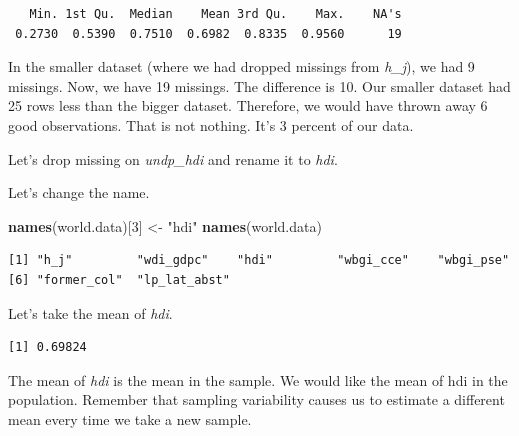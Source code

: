 \documentclass[]{book}
\newenvironment{Shaded}{\begin{snugshade}}{\end{snugshade}}
\newcommand{\KeywordTok}[1]{\textcolor[rgb]{0.13,0.29,0.53}{\textbf{#1}}}
\newcommand{\DecValTok}[1]{\textcolor[rgb]{0.00,0.00,0.81}{#1}}
\newcommand{\StringTok}[1]{\textcolor[rgb]{0.31,0.60,0.02}{#1}}
\newcommand{\OperatorTok}[1]{\textcolor[rgb]{0.81,0.36,0.00}{\textbf{#1}}}
\newcommand{\NormalTok}[1]{#1}
\theoremstyle{definition}
\theoremstyle{definition}
\theoremstyle{definition}
\theoremstyle{remark}
\begin{document}
\begin{verbatim}
   Min. 1st Qu.  Median    Mean 3rd Qu.    Max.    NA's 
 0.2730  0.5390  0.7510  0.6982  0.8335  0.9560      19 
\end{verbatim}

In the smaller dataset (where we had dropped missings from \emph{h\_j}),
we had 9 missings. Now, we have 19 missings. The difference is 10. Our
smaller dataset had 25 rows less than the bigger dataset. Therefore, we
would have thrown away 6 good observations. That is not nothing. It's 3
percent of our data.

Let's drop missing on \emph{undp\_hdi} and rename it to \emph{hdi}.

\begin{Shaded}
\end{Shaded}

Let's change the name.

\begin{Shaded}
\begin{Highlighting}[]
\KeywordTok{names}\NormalTok{(world.data)[}\DecValTok{3}\NormalTok{] <-}\StringTok{ "hdi"}
\KeywordTok{names}\NormalTok{(world.data)}
\end{Highlighting}
\end{Shaded}

\begin{verbatim}
[1] "h_j"         "wdi_gdpc"    "hdi"         "wbgi_cce"    "wbgi_pse"   
[6] "former_col"  "lp_lat_abst"
\end{verbatim}

Let's take the mean of \emph{hdi}.

\begin{Shaded}
\end{Shaded}

\begin{verbatim}
[1] 0.69824
\end{verbatim}

The mean of \emph{hdi} is the mean in the sample. We would like the mean
of hdi in the population. Remember that sampling variability causes us
to estimate a different mean every time we take a new sample.
\end{document}

